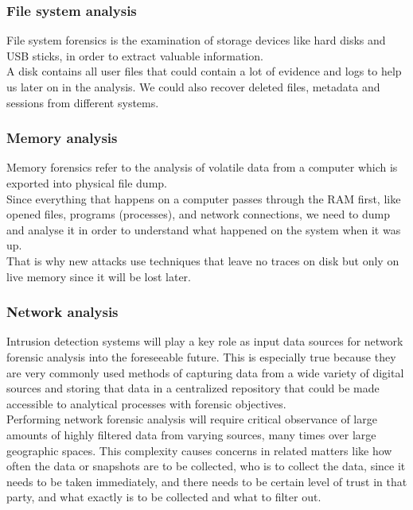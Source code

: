 \subsubsection{File system analysis}
File system forensics is the examination of storage devices like hard disks and USB sticks, in order to extract valuable information.\\
A disk contains all user files that could contain a lot of evidence and logs to help us later on in the analysis. We could also recover deleted files, metadata and sessions from different systems.

\subsubsection{Memory analysis}
Memory forensics refer to the analysis of volatile data from a computer which is exported into physical file dump.\\
Since everything that happens on a computer passes through the RAM first, like opened files, programs (processes), and network connections, we need to dump and analyse it in order to understand what happened on the system when it was up.\\
That is why new attacks use techniques that leave no traces on disk but only on live memory since it will be lost later.

\subsubsection{Network analysis}
Intrusion detection systems will play a key role as input data sources for network forensic analysis into the foreseeable future. This is especially true because they are very commonly used methods of capturing data from a wide variety of digital sources and storing that data in a centralized repository that could be made accessible to analytical processes with forensic objectives.\\
Performing network forensic analysis will require critical observance of large amounts of highly filtered data from varying sources, many times over large geographic spaces. This complexity causes concerns in related matters like how often the data or snapshots are to be collected, who is to collect the data, since it needs to be taken immediately, and there needs to be certain level of trust in that party, and what exactly is to be collected and what to filter out.

